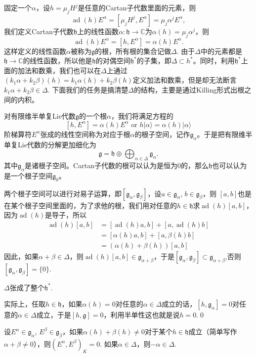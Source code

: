 \documentclass[9pt]{extarticle}
\newcommand{\cc}{\mathbb{C}}
\newcommand{\lag}{{\mathfrak{g}}}
\DeclareMathOperator{\ad}{ad}
\begin{document}
固定一个$\alpha$，设$h=\mu_jH^j$是任意的Cartan子代数里面的元素，则
\[
	\ad(h)E^\alpha=[\mu_jH^j,E^\alpha]=\mu_j\alpha^jE^\alpha,
\]
我们定义Cartan子代数$\mathfrak{h}$上的线性函数$\alpha:\mathfrak{h}\to\cc$为$\alpha(h)=\mu_j\alpha^j$，则
\[
	\ad(h)E^\alpha=[h,E^\alpha]=\alpha(h)E^\alpha.
\]
这样定义的线性函数$\alpha$被称为$\lag$的根，所有根的集合记做$\Delta$. 由于$\Delta$中的元素都是$\mathfrak{h}\to \cc$的线性函数，所以他是$\mathfrak{h}$的对偶空间$\mathfrak{h}^*$的子集，即$\Delta\subset h^*$。同时，利用$\mathfrak{h}^*$上面的加法和数乘，我们也可以在$\Delta$上通过$(k_1\alpha+k_2\beta)(h)=k_1\alpha(h)+k_2\beta(h)$定义加法和数乘，但是却无法断言$k_1\alpha+k_2\beta\in \Delta$. 下面我们的任务是搞清楚$\Delta$的结构，主要是通过Killing形式出根之间的内积。

\para 对有限维半单复Lie代数$\lag$的一个根$\alpha$，我们将满足方程的
\[
[h,E^\alpha]=\alpha(h)E^\alpha\text{ or } h|\alpha\rangle=\alpha(h)|\alpha\rangle
\]
阶梯算符$E^\alpha$张成的线性空间称为对应于根$\alpha$的根子空间，记作$\lag_{\alpha}$。于是把有限维半单复Lie代数的分解更加细化为
\[
	\lag=\mathfrak{h}\oplus \bigoplus_{\alpha\in\Delta} \lag_\alpha.
\]
其中$\lag_\alpha$是诸根子空间。Cartan子代数的根可以认为是恒为0的，那么$\mathfrak{h}$也可以认为是一个根子空间$\lag_0$。

两个根子空间可以进行对易子运算，即$[\lag_\alpha,\lag_\beta]$，设$a\in\lag_\alpha$, $b\in\lag_\beta$，则
$[a,b]$也是在某个根子空间里面的，为了求他的根，我们用对任意的$h\in \mathfrak{h}$求$\ad(h)[a,b]$，因为$\ad(h)$是导子，所以
\[
	\begin{split}
		\ad(h)[a,b]&=[\ad(h)a,b]+[a,\ad(h)b]\\
		&=[\alpha(h)a,b]+[a,\beta(h)b]\\
		&=(\alpha(h)+\beta(h))[a,b]
	\end{split}
\]
因此，如果$\alpha+\beta\in\Delta$，则$\ad(h)[a,b]\in \lag_{\alpha+\beta}$，于是$[\lag_\alpha,\lag_\beta]\subset \lag_{\alpha+\beta}$,否则$[\lag_\alpha,\lag_\beta]=\{0\}$.

\pro $\Delta$张成了整个$\mathfrak{h}^*$.

\proof 实际上，任取$h\in \mathfrak{h}$，如果$\alpha(h)=0$对任意的$\alpha\in \Delta$成立的话，$[h,\lag_{\alpha}]=0$对任意的$\alpha\in \Delta$成立，于是$[h,\lag]=0$，利用半单性这也就是说$h=0$.\qed

\pro 设$E^\alpha\in\lag_\alpha$, $E^\beta\in\lag_\beta$，如果$\alpha(h)+\beta(h)\neq 0$对于某个$h\in \mathfrak{h}$成立（简单写作$\alpha+\beta\neq 0$），则$(E^\alpha,E^\beta)_K=0$. 如果$\alpha\in\Delta$，则$-\alpha\in\Delta$.
\end{document}
